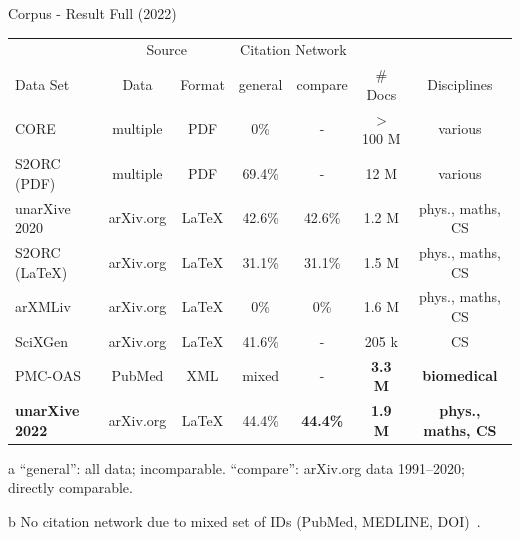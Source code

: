 \documentclass[en,16:9,smallfoot]{sdqbeamer}
\begin{document}
   \begin{frame}{Corpus - Result Full (2022)}
    \begin{table}
      \centering
      \begin{small}
     \begin{threeparttable}
      \begin{tabular}{lcccccc}
        \toprule
        \ & \multicolumn{2}{c}{Source} & \multicolumn{2}{c}{\hphantom{wi}Citation Network\tnote{a}} & \ & \ \\
        Data Set & Data & Format & general & compare & \# Docs & Disciplines \\
        \midrule
        CORE~\cite{core} & multiple & PDF & 0\% & - & $>$100 M & various \\
        S2ORC (PDF)~\cite{Lo2020} & multiple & PDF & 69.4\% & - & 12 M & various \\
        unarXive 2020~\cite{Saier2020} & arXiv.org & \LaTeX & 42.6\% & 42.6\% & 1.2 M & phys., maths, CS \\
        \midrule
        S2ORC (\LaTeX)~\cite{Lo2020} & arXiv.org & \LaTeX & 31.1\% & 31.1\% & 1.5 M & phys., maths, CS \\
        arXMLiv~\cite{arXMLiv} & arXiv.org & \LaTeX & 0\% & 0\% & 1.6 M & phys., maths, CS \\
        SciXGen~\cite{chen2021-scixgen} & arXiv.org & \LaTeX & 41.6\% & - & 205 k & CS \\
        PMC-OAS~\cite{pmc_oas} & PubMed & XML & mixed\tnote{b} & - & \textbf{3.3 M} & \textbf{biomedical} \\
        \textbf{unarXive 2022}~\cite{Saier2023unarXive} & arXiv.org & \LaTeX & 44.4\% & \textbf{44.4\%} & \textbf{1.9 M} & \textbf{phys., maths, CS} \\
        \bottomrule
      \end{tabular}
     \begin{tablenotes}
        \item[a] {\color{contextgrey}``general'': all data; incomparable. ``compare'': arXiv.org data 1991--2020; directly comparable.}
        \item[b] {\color{contextgrey}No citation network due to mixed set of IDs (PubMed, MEDLINE, DOI)~\cite{Gipp2015}.}
      \end{tablenotes}
    \end{threeparttable}
      \end{small}
    \end{table}
   \end{frame}
\end{document}
